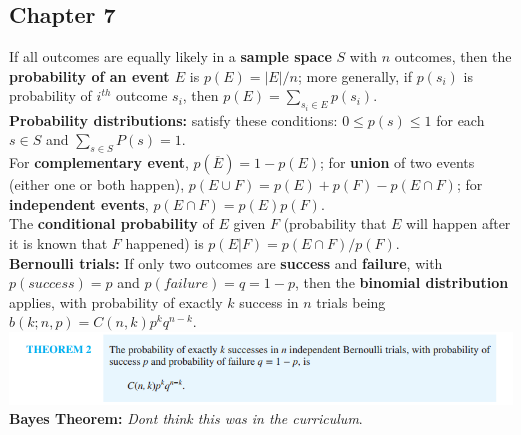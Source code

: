 \documentclass[12pt]{article}
\begin{document}
\subsection{Chapter 7} 
If all outcomes are equally likely in a \textbf{sample space} $S$ with $n$ outcomes, then the \textbf{probability of an event $E$} is $p(E) =|E|/n$; more generally, if $p(s_i)$ is probability of $i^{th}$ outcome $s_i$, then $p(E) = \sum_{s_i \in E} p(s_i)$. \\
\textbf{Probability distributions:} satisfy these conditions: $0 \leq p(s) \leq 1$ for each $s \in S$ and $\sum_{s \in S} P(s) = 1$. \\
For \textbf{complementary event}, $p(\overline{E}) = 1 - p(E)$; for \textbf{union} of two events (either one or both happen), $p(E\cup F) = p(E) + p(F) - p(E \cap F)$; for \textbf{independent events}, $p(E \cap F) = p(E)p(F)$. \\
The \textbf{conditional probability} of $E$ given $F$ (probability that $E$ will happen after it is known that $F$ happened) is $p(E|F) = p (E \cap F)/p(F)$. \\
\textbf{Bernoulli trials:} If only two outcomes are \textbf{success} and \textbf{failure}, with $p(success) = p$ and $p(failure) = q = 1 - p$, then the \textbf{binomial distribution} applies, with probability of exactly $k$ success in $n$ trials being $b(k;n,p) = C(n,k)p^kq^{n-k}$. \\
\includegraphics[scale=0.8]{bernoulli}\\
\textbf{Bayes Theorem:} \textit{Dont think this was in the curriculum}.\\
\newpage
\end{document}

